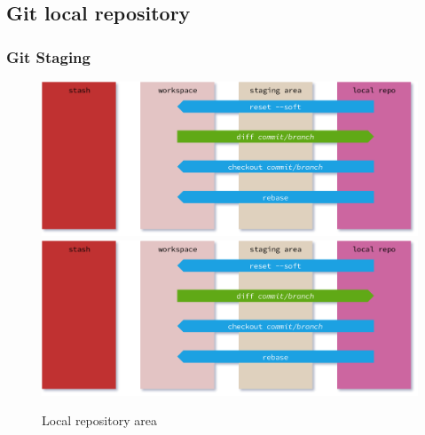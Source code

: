 \subsection*{Git local repository}
\begin{frame}[fragile]
    \frametitle{Git Staging}
    \begin{figure}
        \begin{center}
            {
                \includegraphics[width=1\textwidth,keepaspectratio]{./images/GitAreas-LocalRepo.png}
            }
            {
                \includegraphics[height=0.75\textheight,keepaspectratio]{./images/GitAreas-LocalRepo.png}
            }
            \caption{Local repository area}
        \end{center}
    \end{figure}
\end{frame}

